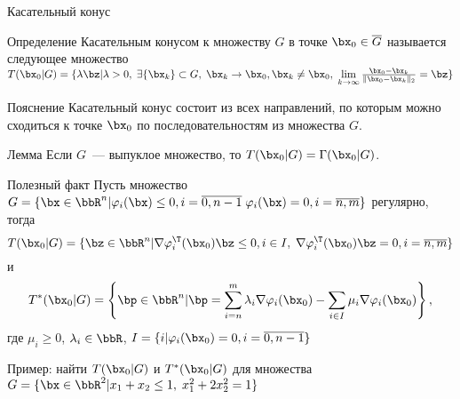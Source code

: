 \documentclass[12pt,russian]{beamer}
\begin{document}
\begin{frame}{Касательный конус}
\begin{block}{Определение}
Касательным конусом к множеству $G$ в точке $\bx_0 \in \overline{G}$ называется следующее множество $T(\bx_0 |G) = \{ \lambda \bz | \lambda > 0, \; \exists \{\bx_k\} \subset G, \; \bx_k \rightarrow \bx_0, \bx_k \neq \bx_0, \; \lim\limits_{k \rightarrow \infty} \frac{\bx_0 - \bx_k}{\|\bx_0 - \bx_k\|_2} = \bz \}$
\end{block}

\begin{block}{Пояснение}
Касательный конус состоит из всех направлений, по которым можно сходиться к точке $\bx_0$ по последовательностям из множества $G$.
\end{block}

\begin{block}{Лемма}
Если $G$~--- выпуклое множество, то $T(\bx_0|G) = \Gamma(\bx_0|G)$.
\end{block}
\end{frame}

\begin{frame}{Полезный факт}
Пусть множество $G = \{\bx \in \bbR^n | \varphi_i(\bx) \leq 0, i = \overline{0, n-1} \; \varphi_i(\bx) = 0, i = \overline{n, m} \}$ регулярно, тогда \vspace{-4mm}
\[
T(\bx_0|G) = \{ \bz \in \bbR^n | \nabla \varphi^{\T}_i(\bx_0)\bz \leq 0, i \in I, \; \nabla \varphi^{\T}_i(\bx_0)\bz = 0, i = \overline{n,m} \}
\vspace{-4mm}
\]
и \vspace{-4mm}
\[
T^*(\bx_0|G) = \left \{ \bp \in \bbR^n | \bp = \sum\limits_{i = n}^m \lambda_i \nabla \varphi_i(\bx_0) - \sum\limits_{i \in I} \mu_i \nabla \varphi_i(\bx_0) \right \},
\] 
где $\mu_i \geq 0$, $\lambda_i \in \bbR$, $I = \{i | \varphi_i(\bx_0) = 0, i = \overline{0, n-1} \}$

Пример: найти $T(\bx_0|G)$ и $T^*(\bx_0|G)$ для множества $G = \{\bx \in \bbR^2 | x_1 + x_2 \leq 1, \; x^2_1 + 2x_2^2 = 1 \}$
\end{frame}
\end{document}
